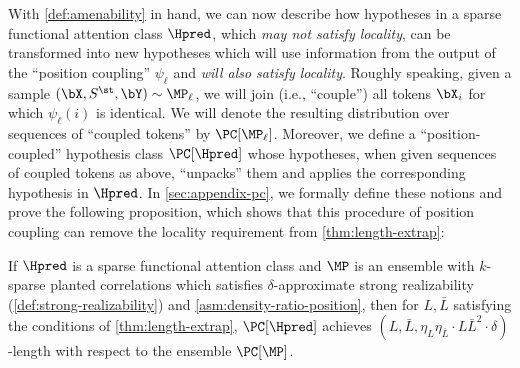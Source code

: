 \documentclass{article}
\newcommand{\arxiv}[1]{\iftoggle{icml}{}{#1}}
\begin{document}
With \cref{def:amenability} in hand, we can now describe how hypotheses in a sparse functional attention class $\Hpred$, which \emph{may not satisfy locality}, can be transformed into new hypotheses which will use information from the output of the ``position coupling'' $\psi_\ell$ and \emph{will also satisfy locality}. Roughly speaking, given a sample $(\bX, S^\st, \bY) \sim \MP_\ell$, we will join (i.e., ``couple'') all tokens $\bX_i$ for which $\psi_\ell(i)$ is identical. We will denote the resulting distribution over sequences of ``coupled tokens'' by $\PC[\MP_\ell]$. Moreover, we define a ``position-coupled'' hypothesis class $\PC[\Hpred]$ whose hypotheses, when given sequences of coupled tokens as above, ``unpacks'' them and applies the corresponding hypothesis in $\Hpred$. In \cref{sec:appendix-pc}, we formally define these notions and prove the following proposition, which shows that this procedure of position coupling can remove the locality requirement from \cref{thm:length-extrap}:
\begin{proposition}
  \label{prop:pc-length-extrap-informal}
If $\Hpred$ is a sparse functional attention class and $\MP$ is an ensemble with $k$-sparse planted correlations  which satisfies $\delta$-approximate strong realizability (\cref{def:strong-realizability}) and \cref{asm:density-ratio-position}, then for $L, \bar L$ satisfying the conditions of \cref{thm:length-extrap}, $\PC[\Hpred]$ achieves $(L, \bar L, \eta_L \eta_{\bar L} \cdot L\bar L^2 \cdot \delta)$-length \generalization with respect to the ensemble $\PC[\MP]$. 
\end{proposition}

\arxiv{
\begin{remark}[Theoretical justification for PoSE]
  \label{rmk:pose}
  It is natural to wonder if our theoretical framework allows us to justify other techniques used to induce length \generalization, such as PoSE (\cref{sec:prelim-pose}), in a sense akin to \cref{prop:pc-length-extrap-informal}. At a high level, PoSE is adjusting the {distribution} of position IDs during training, so that IDs always seen farther apart than the training context window at test time may nevertheless be observed in the same training instance. In other words, a model trained as such should ``interpret'' a greater range of sets $S$ as satisfying the locality requirement of \cref{asm:local-relative}. Thus, we conjecture that this adjustment allows us to remove the locality requirement in \cref{asm:local-relative} as well; we leave a formal proof of this fact as an intriguing direction for future work. 
\end{remark}
}
\end{document}
